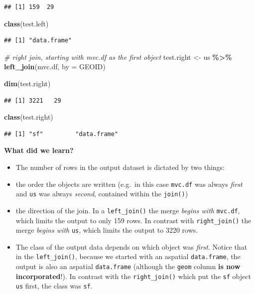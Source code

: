 \documentclass[
]{book}
\newenvironment{Shaded}{\begin{snugshade}}{\end{snugshade}}
\newcommand{\AttributeTok}[1]{\textcolor[rgb]{0.13,0.29,0.53}{#1}}
\newcommand{\CommentTok}[1]{\textcolor[rgb]{0.56,0.35,0.01}{\textit{#1}}}
\newcommand{\FunctionTok}[1]{\textcolor[rgb]{0.13,0.29,0.53}{\textbf{#1}}}
\newcommand{\NormalTok}[1]{#1}
\newcommand{\OtherTok}[1]{\textcolor[rgb]{0.56,0.35,0.01}{#1}}
\newcommand{\SpecialCharTok}[1]{\textcolor[rgb]{0.81,0.36,0.00}{\textbf{#1}}}
\newcommand{\StringTok}[1]{\textcolor[rgb]{0.31,0.60,0.02}{#1}}
\providecommand{\tightlist}{%
  \setlength{\itemsep}{0pt}\setlength{\parskip}{0pt}}
\begin{document}
\begin{verbatim}
## [1] 159  29
\end{verbatim}

\begin{Shaded}
\begin{Highlighting}[]
\FunctionTok{class}\NormalTok{(test.left)}
\end{Highlighting}
\end{Shaded}

\begin{verbatim}
## [1] "data.frame"
\end{verbatim}

\begin{Shaded}
\begin{Highlighting}[]
\CommentTok{\# right join, starting with mvc.df as the first object}
\NormalTok{test.right }\OtherTok{\textless{}{-}}\NormalTok{ us }\SpecialCharTok{\%\textgreater{}\%}
  \FunctionTok{left\_join}\NormalTok{(mvc.df, }\AttributeTok{by =} \StringTok{\textquotesingle{}GEOID\textquotesingle{}}\NormalTok{)}

\FunctionTok{dim}\NormalTok{(test.right)}
\end{Highlighting}
\end{Shaded}

\begin{verbatim}
## [1] 3221   29
\end{verbatim}

\begin{Shaded}
\begin{Highlighting}[]
\FunctionTok{class}\NormalTok{(test.right)}
\end{Highlighting}
\end{Shaded}

\begin{verbatim}
## [1] "sf"         "data.frame"
\end{verbatim}

\textbf{What did we learn?}

\begin{itemize}
\tightlist
\item
  The number of rows in the output dataset is dictated by two things:
\item
  the order the objects are written (e.g.~in this case \texttt{mvc.df} was always \emph{first} and \texttt{us} was always \emph{second}, contained within the \texttt{join()})
\item
  the direction of the join. In a \texttt{left\_join()} the merge \emph{begins with} \texttt{mvc.df}, which limits the output to only 159 rows. In contrast with \texttt{right\_join()} the merge \emph{begins with} \texttt{us}, which limits the output to 3220 rows.
\item
  The class of the output data depends on which object was \emph{first}. Notice that in the \texttt{left\_join()}, because we started with an aspatial \texttt{data.frame}, the output is also an aspatial \texttt{data.frame} (although the \texttt{geom} column \textbf{is now incorporated}!). In contrast with the \texttt{right\_join()} which put the \texttt{sf} object \texttt{us} first, the class was \texttt{sf}.
\end{itemize}
\end{document}
